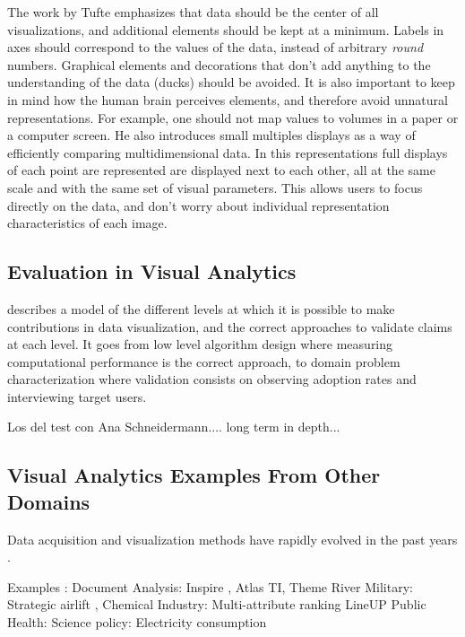 The work by Tufte \autocite{tufte_visual_1983} emphasizes that data should be the center of all visualizations, and additional elements should be kept at a minimum. Labels in axes should correspond to the values of the data, instead of arbitrary \emph{round} numbers. Graphical elements and decorations that don't add anything to the understanding of the data (ducks) should be avoided. It is also important to keep in mind how the human brain perceives elements, and therefore avoid unnatural representations. For example, one should not map values to volumes in a paper or a computer screen. He also introduces small multiples displays as a way of efficiently comparing multidimensional data. In this representations full displays of each point are represented are displayed next to each other, all at the same scale and with the same set of visual parameters. This allows users to focus directly on the data, and don't worry about individual representation characteristics of each image.


\subsection{Evaluation in Visual Analytics}

\autocite{munzner_nested_2009} describes a model of the different levels at which it is possible to make contributions in data visualization, and the correct approaches to validate claims at each level. It goes from low level algorithm design where measuring computational performance is the correct approach, to domain problem characterization where validation consists on observing adoption rates and interviewing target users.

Los del test con Ana
Schneidermann.... long term in depth...

\subsection{Visual Analytics Examples From Other Domains}

Data acquisition and visualization methods have rapidly evolved in the past years \autocite{botha_individual_2012}.

Examples : 
Document Analysis: Inspire \autocite{hetzler_analysis_2004}, Atlas TI, Theme River \autocite{themerivertm:_2002}
Military: Strategic airlift \autocite{soban_visual_2011},
Chemical Industry: \autocite{stahl_overview_2013}
Multi-attribute ranking LineUP \autocite{gratzl_lineup:_2013}
Public Health: \autocite{sedig_challenge_2014}
Science policy: \autocite{mcinerny_information_2014}
Electricity consumption \autocite{janetzko_anomaly_2014}

